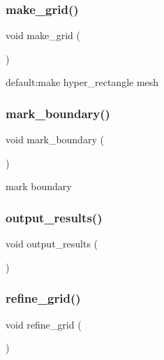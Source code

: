\subsubsection{\texorpdfstring{make\_grid()}{make\_grid()}}
{\footnotesize\ttfamily void make\+\_\+grid (\begin{DoxyParamCaption}{ }\end{DoxyParamCaption})\hspace{0.3cm}{\ttfamily [virtual]}}

default\+:make hyper\+\_\+rectangle mesh \mbox{\label{classmechano_chem_f_e_m_a7ed791f6f2c777286743182bf2f481bf}} 
\subsubsection{\texorpdfstring{mark\_boundary()}{mark\_boundary()}}
{\footnotesize\ttfamily void mark\+\_\+boundary (\begin{DoxyParamCaption}{ }\end{DoxyParamCaption})\hspace{0.3cm}{\ttfamily [virtual]}}

mark boundary \mbox{\label{classmechano_chem_f_e_m_a40157fe5d9875c83d46e3a86a680c758}} 
\subsubsection{\texorpdfstring{output\_results()}{output\_results()}}
{\footnotesize\ttfamily void output\+\_\+results (\begin{DoxyParamCaption}{ }\end{DoxyParamCaption})\hspace{0.3cm}{\ttfamily [virtual]}}

\mbox{\label{classmechano_chem_f_e_m_aea55077652a6fc58f1c0c250c4abd856}} 
\subsubsection{\texorpdfstring{refine\_grid()}{refine\_grid()}}
{\footnotesize\ttfamily void refine\+\_\+grid (\begin{DoxyParamCaption}{ }\end{DoxyParamCaption})\hspace{0.3cm}{\ttfamily [virtual]}}

